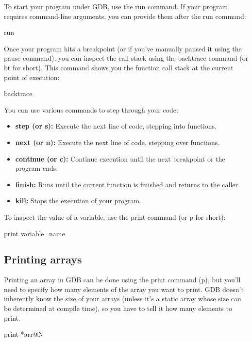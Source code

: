 \documentclass{report}
\begin{document}
     \bigbreak \noindent 
     \bigbreak \noindent 
     To start your program under GDB, use the run command. If your program requires command-line arguments, you can provide them after the run command:
     \bigbreak \noindent 
     \begin{bashcode}
     run
     \end{bashcode}
     \bigbreak \noindent 
     \bigbreak \noindent 
     Once your program hits a breakpoint (or if you've manually paused it using the pause command), you can inspect the call stack using the backtrace command (or bt for short). This command shows you the function call stack at the current point of execution:
     \bigbreak \noindent 
     \begin{bashcode}
     backtrace
     \end{bashcode}
     \bigbreak \noindent 
     \bigbreak \noindent 
     You can use various commands to step through your code:
     \begin{itemize}
         \item \textbf{step (or s):} Execute the next line of code, stepping into functions.
         \item \textbf{next (or n):} Execute the next line of code, stepping over functions.
         \item \textbf{continue (or c):} Continue execution until the next breakpoint or the program ends.
         \item \textbf{finish:} Runs until the current function is finished and returns to the caller.
         \item \textbf{kill:} Stops the execution of your program.
     \end{itemize}
     \bigbreak \noindent 
     \bigbreak \noindent 
     To inspect the value of a variable, use the print command (or p for short):
     \bigbreak \noindent 
     \begin{bashcode}
     print variable_name
     \end{bashcode}
     \bigbreak \noindent 
     \subsection{Printing arrays}
     \bigbreak \noindent 
     Printing an array in GDB can be done using the print command (p), but you'll need to specify how many elements of the array you want to print. GDB doesn't inherently know the size of your arrays (unless it's a static array whose size can be determined at compile time), so you have to tell it how many elements to print.
     \bigbreak \noindent 
     \begin{bashcode}
     print *arr@N
     \end{bashcode}
\end{document}
